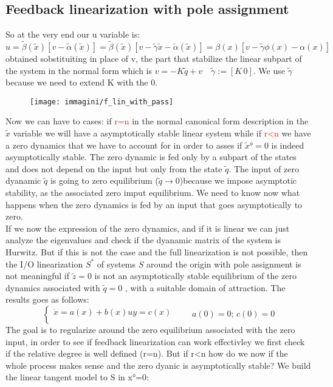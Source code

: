 \subsection{Feedback linearization with pole assignment}
So at the very end our u variable is:\[
	u=\tilde{\beta}(\tilde{x})[v-\tilde{\alpha}(\tilde{x})]=\tilde{\beta}(\tilde{x})[v-\tilde{\gamma}\tilde{x}-\tilde{\alpha}(\tilde{x})]=\beta(x)[v-\tilde{\gamma}\phi(x)-\alpha(x)]
\] obtained sobstituiting in place of v, the part that stabilize the linear subpart of the system in the normal form which is $v=-K\tilde{q}+v \quad \tilde{\gamma}:=[K \, 0]$. We use $\tilde{\gamma}$ because we need to extend K with the 0.
\begin{figure}[H]
	\centering
	\texttt{[image: immagini/f\_lin\_with\_pass]}
	\caption{}
	\label{fig:flinwithpass}
\end{figure}
Now we can have to cases: if \textcolor{red}{r=n} in the normal canonical form description in the $\tilde{x}$	variable we will have a asymptotically stable linear system	while if \textcolor{red}{r<n} we have a zero dynamics that we have to account for in order to asses if $\tilde{x}°=0$ is indeed asymptotically stable.
The zero dynamic is fed only by a subpart of the states and does not depend on the input but only from the state $\tilde{q}$. The input of zero dyanamic $\tilde{q}$ is going to zero equilibrium ($\tilde{q}\to0$)because we impose asymptotic stability, as the associated zero imput equilibrium. We need to know now what happens when the zero dynamics is fed by an input that goes asymptotically to zero.\\
If we now the expression of the zero dynamics, and if it is linear we can just analyze the eigenvalues and check if the dyanamic matrix of the system is Hurwitz. But if this is not the case and the full linearization is not possible, then
the I/O linearization $S^*$ of systems $S$ around the origin with pole assignment is not meaningful if $\tilde{z}=0$ is not an asymptotically stable equilibrium of the zero dynamics associated with $\tilde{q}=0$  , with a suitable domain of attraction. The results goes as follows:
\begin{equation*}
	\left\{
	\begin{array}{ll}	
		\dot{x}=a(x)+b(x)u
		y=c(x)\\
	\end{array}
	\right. \qquad a(0)=0;\, c(0)=0
\end{equation*}
The goal is to regularize around the zero equilibrium associated with the zero input, in order to see if feedback linearization can work effectivley we first check if the relative degree is well defined (r=n). But if r<n how do we now if the whole process makes sense and the zero dyanic is asymptotically stable? We build the linear tangent model to S in x°=0:
